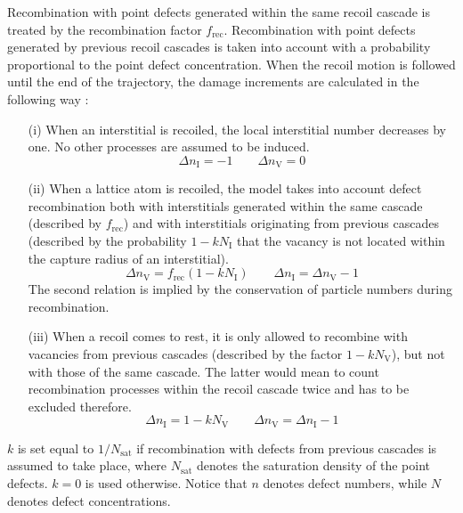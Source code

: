 Recombination with point defects generated within the same recoil 
cascade is treated by the recombination factor $f_\mathrm{rec}$.
Recombination with point defects generated by previous recoil cascades is
taken into account with a probability proportional to the point defect 
concentration. When the recoil motion is followed until the end of the 
trajectory, the damage increments are calculated in the following way
\cite{hobler_net_1996}: 
%
%
\begin{enumerate}
\item[(i)]
When an interstitial is recoiled, the local interstitial number decreases
by one. No other processes are assumed to be induced.
%
\begin{equation}
   \Delta n_\mathrm{I} = - 1 \qquad \Delta n_\mathrm{V} = 0
\end{equation}
%
\item[(ii)]
When a lattice atom is recoiled, the model takes into account defect 
recombination both with interstitials generated within the same 
cascade (described by $f_\mathrm{rec}$) and with interstitials originating from 
previous cascades (described by the probability $1-kN_\mathrm{I}$ that the 
vacancy is not located within the capture radius of an interstitial). 
%
\begin{equation}
   \Delta n_\mathrm{V} = f_\mathrm{rec} (1-kN_\mathrm{I}) \qquad 
   \Delta n_\mathrm{I} = \Delta n_\mathrm{V} - 1
   \label{eq:rgl}
\end{equation}
%
The second relation is implied by the conservation of particle numbers
during recombination.
%
\item[(iii)]
When a recoil comes to rest, it is only allowed to recombine with vacancies 
from previous cascades (described by the factor $1-kN_\mathrm{V}$), 
but not with those of the same cascade. The latter 
would mean to count recombination processes within the recoil cascade twice
and has to be excluded therefore.
%
\begin{equation}
   \Delta n_\mathrm{I} = 1-kN_\mathrm{V} \qquad 
   \Delta n_\mathrm{V} = \Delta n_\mathrm{I} - 1
   \label{eq:rs}   
\end{equation}
%
\end{enumerate}
%
$k$ is set equal to $1/N_\mathrm{sat}$ if recombination with defects from 
previous cascades is assumed to take place, where $N_\mathrm{sat}$ denotes the
saturation density of the point defects. $k=0$ is used otherwise. Notice that
$n$ denotes defect numbers, while $N$ denotes defect concentrations.

